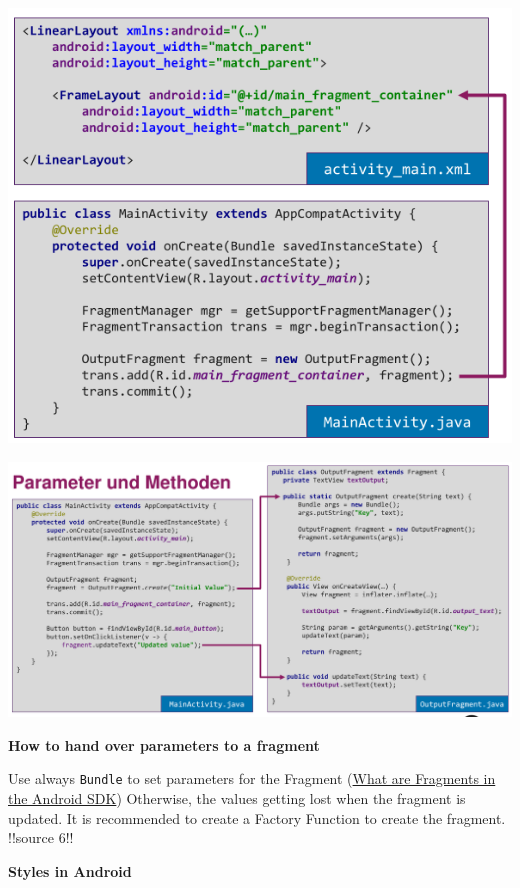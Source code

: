 \documentclass[11pt,twoside,landscape]{article}
\begin{document}
\begin{multicols}{3}
\begin{center}
\includegraphics[width=.9\linewidth]{img/fragment_dynamic_include.png}
\end{center}

\begin{center}
\includegraphics[width=.9\linewidth]{img/fragment_parameter_method.png}
\end{center}


\textbf{How to hand over parameters to a fragment}

Use always \texttt{Bundle} to set parameters for the Fragment (\href{../../../roam/20211023174645-what_are_fragments_in_the_android_sdk.org}{What are Fragments in the Android SDK})
Otherwise, the values getting lost when the fragment is updated.
It is recommended to create a Factory Function to create the fragment.
!!source 6!!


\textbf{Styles in Android}


\end{multicols}
\end{document}
